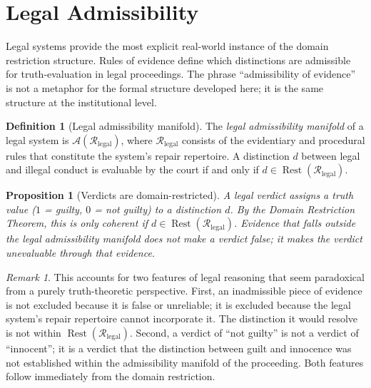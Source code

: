 \documentclass[12pt, oneside]{article}
\theoremstyle{plain}
\newtheorem{proposition}[theorem]{Proposition}
\theoremstyle{definition}
\newtheorem{definition}[theorem]{Definition}
\theoremstyle{remark}
\newtheorem{remark}[theorem]{Remark}
\DeclareMathOperator{\Rest}{Rest}
\newcommand{\AO}{\mathcal{A}}
\begin{document}
\section{Legal Admissibility}
\label{sec:legal}

Legal systems provide the most explicit real-world instance of the
domain restriction structure.
Rules of evidence define which distinctions are admissible for
truth-evaluation in legal proceedings.
The phrase ``admissibility of evidence'' is not a metaphor for the
formal structure developed here; it is the same structure at the
institutional level.

\begin{definition}[Legal admissibility manifold]
  The \emph{legal admissibility manifold} of a legal system is
  $\AO(\mathcal{R}_{\text{legal}})$, where
  $\mathcal{R}_{\text{legal}}$ consists of the evidentiary and
  procedural rules that constitute the system's repair repertoire.
  A distinction $d$ between legal and illegal conduct is evaluable
  by the court if and only if $d \in \Rest(\mathcal{R}_{\text{legal}})$.
\end{definition}

\begin{proposition}[Verdicts are domain-restricted]
  A legal verdict assigns a truth value ($1$ = guilty,
  $0$ = not guilty) to a distinction $d$.
  By the Domain Restriction Theorem, this is only coherent if
  $d \in \Rest(\mathcal{R}_{\text{legal}})$.
  Evidence that falls outside the legal admissibility manifold
  does not make a verdict false; it makes the verdict unevaluable
  through that evidence.
\end{proposition}

\begin{remark}
  This accounts for two features of legal reasoning that seem
  paradoxical from a purely truth-theoretic perspective.
  First, an inadmissible piece of evidence is not excluded because
  it is false or unreliable; it is excluded because the legal
  system's repair repertoire cannot incorporate it.
  The distinction it would resolve is not within
  $\Rest(\mathcal{R}_{\text{legal}})$.
  Second, a verdict of ``not guilty'' is not a verdict of
  ``innocent''; it is a verdict that the distinction between guilt
  and innocence was not established within the admissibility
  manifold of the proceeding.
  Both features follow immediately from the domain restriction.
\end{remark}
\end{document}

